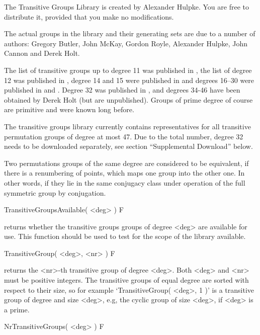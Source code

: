 
The Transitive Groups Library is created by Alexander Hulpke.
You are free to distribute it, provided that you make no modifications.

The actual groups in the library and their generating sets are due to a
number of authors:
Gregory Butler, John McKay, Gordon
Royle, Alexander Hulpke, John Cannon and Derek Holt. 

The list of transitive  groups up  to degree 11
was published in \cite{BM83},  the list of degree  12 was published in
\cite{Roy87}, degree 14 and  15 were published in  \cite{Butler93} and
degrees 16--30 were published in \cite{Hulpke96} and \cite{HulpkeTG}.
Degree 32 was published in \cite{CanHolt32}, and degrees 34-46 have been
obtained by Derek Holt (but are unpublished).
Groups of prime degree of course are
primitive and were known long before.

The transitive groups library currently contains representatives for all
transitive permutation groups of degree at most  47. Due to the total number,
degree 32 needs to be downloaded separately, see section ``Supplemental
Download'' below.

Two permutations groups of the same degree are considered to be
equivalent, if there is a renumbering of points, which maps one group into
the other one.
In other words, if they lie in the same conjugacy class under operation
of the full symmetric group by conjugation.


\>TransitiveGroupsAvailable( <deg> ) F

returns whether the transitive groups groups of degree <deg> are available
for use. This function should be used to test for the scope of the library
available.

\>TransitiveGroup( <deg>, <nr> ) F

returns the <nr>-th transitive  group of degree <deg>.  Both  <deg> and
<nr> must be  positive integers. The transitive groups of equal  degree
are  sorted with  respect to   their  size, so for  example
`TransitiveGroup(  <deg>, 1 )' is a  transitive group  of degree and
size <deg>, e.g, the cyclic  group  of size <deg>,   if <deg> is a
prime.

\>NrTransitiveGroups( <deg> ) F

